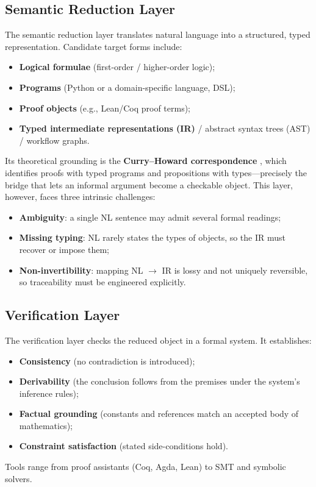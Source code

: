 \documentclass[11pt]{article}
\begin{document}
\subsection{Semantic Reduction Layer}
\label{sec:reduction}
The semantic reduction layer translates natural language into a structured, typed
representation. Candidate target forms include:
\begin{itemize}
    \item \textbf{Logical formulae} (first-order / higher-order logic);
    \item \textbf{Programs} (Python or a domain-specific language, DSL);
    \item \textbf{Proof objects} (e.g., Lean/Coq proof terms);
    \item \textbf{Typed intermediate representations (IR)} / abstract syntax trees
          (AST) / workflow graphs.
\end{itemize}
Its theoretical grounding is the \textbf{Curry--Howard correspondence}
\cite{howard1980formulae,sorensen2006lectures}, which identifies proofs with typed
programs and propositions with types---precisely the bridge that lets an informal
argument become a checkable object. This layer, however, faces three intrinsic
challenges:
\begin{itemize}
    \item \textbf{Ambiguity}: a single NL sentence may admit several formal readings;
    \item \textbf{Missing typing}: NL rarely states the types of objects, so the IR
          must recover or impose them;
    \item \textbf{Non-invertibility}: mapping NL $\rightarrow$ IR is lossy and not
          uniquely reversible, so traceability must be engineered explicitly.
\end{itemize}

\subsection{Verification Layer}
\label{sec:verify}
The verification layer checks the reduced object in a formal system. It establishes:
\begin{itemize}
    \item \textbf{Consistency} (no contradiction is introduced);
    \item \textbf{Derivability} (the conclusion follows from the premises under the
          system's inference rules);
    \item \textbf{Factual grounding} (constants and references match an accepted body
          of mathematics);
    \item \textbf{Constraint satisfaction} (stated side-conditions hold).
\end{itemize}
Tools range from proof assistants (Coq, Agda, Lean) to SMT and symbolic solvers.
\end{document}
